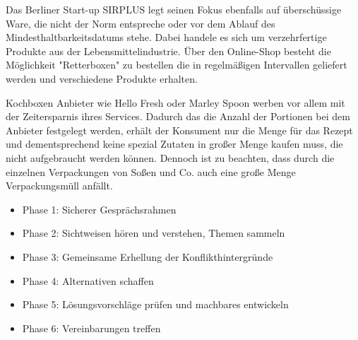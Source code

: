 Das Berliner Start-up SIRPLUS legt seinen Fokus ebenfalls auf überschüssige Ware, die nicht der Norm entspreche oder vor dem Ablauf des Mindesthaltbarkeitsdatums stehe. Dabei handele es sich um verzehrfertige Produkte aus der Lebensmittelindustrie. Über den Online-Shop besteht die Möglichkeit "Retterboxen" zu bestellen die in regelmäßigen Intervallen geliefert werden und verschiedene Produkte erhalten.

Kochboxen Anbieter wie Hello Fresh oder Marley Spoon werben vor allem mit der Zeitersparnis ihres Services. Dadurch das die Anzahl der Portionen bei dem Anbieter festgelegt werden, erhält der Konsument nur die Menge für das Rezept und dementsprechend keine spezial Zutaten in großer Menge kaufen muss, die nicht aufgebraucht werden können. Dennoch ist zu beachten, dass durch die einzelnen Verpackungen von Soßen und Co. auch eine große Menge Verpackungsmüll anfällt.


\begin{itemize}
  \item {Phase 1}: Sicherer Gesprächsrahmen
  \item {Phase 2}: Sichtweisen hören und verstehen, Themen sammeln
  \item {Phase 3}: Gemeinsame Erhellung der Konflikthintergründe
  \item {Phase 4}: Alternativen schaffen
  \item {Phase 5}: Lösungsvorschläge prüfen und machbares entwickeln
  \item {Phase 6}: Vereinbarungen treffen
\end{itemize}



